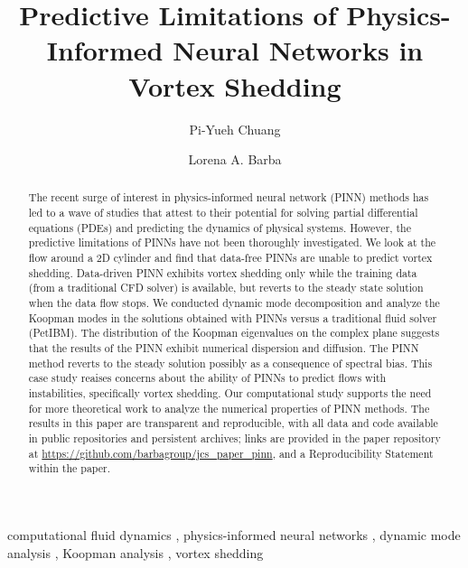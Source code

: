 \documentclass[5p, twocolumn, times, sort&compress]{elsarticle}
\begin{document}
    \begin{frontmatter}
        \title{%
        Predictive Limitations of Physics-Informed Neural Networks in Vortex Shedding%
        }

        \author[1]{Pi-Yueh Chuang}
        \author[1]{Lorena A. Barba}

        \begin{abstract}
            The recent surge of interest in physics-informed neural network (PINN) methods has led to a wave of studies that attest to their potential for solving partial differential equations (PDEs) and predicting the dynamics of physical systems. However, the predictive limitations of PINNs have not been thoroughly investigated. We look at the flow around a 2D cylinder and find that data-free PINNs are unable to predict vortex shedding. Data-driven PINN exhibits vortex shedding only while the training data (from a traditional CFD solver) is available, but reverts to the steady state solution when the data flow stops. We conducted dynamic mode decomposition and analyze the Koopman modes in the solutions obtained with PINNs versus a traditional fluid solver (PetIBM). The distribution of the Koopman eigenvalues on the complex plane suggests that the results of the PINN exhibit numerical dispersion and diffusion. The PINN method  reverts to the steady solution possibly as a consequence of spectral bias. This case study reaises concerns about the ability of PINNs to predict flows with instabilities, specifically vortex shedding. Our computational study supports the need for more theoretical work to analyze the numerical properties of PINN methods. The results in this paper are transparent and reproducible, with all data and code available in public repositories and persistent archives; links are provided in the paper repository at \url{https://github.com/barbagroup/jcs_paper_pinn}, and a Reproducibility Statement within the paper.
        \end{abstract}

        \begin{keyword}
            computational fluid dynamics \sep
            physics-informed neural networks \sep
            dynamic mode analysis \sep
            Koopman analysis \sep
            vortex shedding
        \end{keyword}
    \end{frontmatter}
\end{document}

